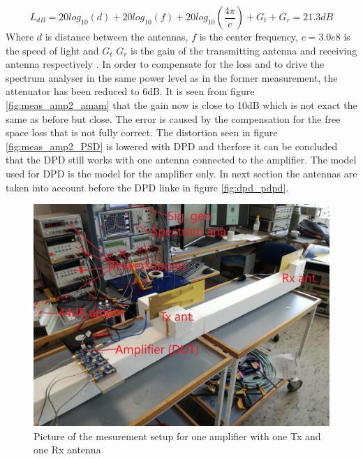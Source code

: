 \begin{equation}
 L_{dB} = 20log_{10}(d)+20log_{10}(f)+20log_{10}(\frac{4\pi}{c})+G_t+G_r = 21.3dB
\end{equation}
Where $d$ is distance between the antennas, $f$ is the center frequency, $c=3.0e8$ is the speed of light and $G_t$ $G_r$ is the gain of the transmitting antenna and receiving antenna respectively \citep{Balanis2005}. In order to compensate for the loss and to drive the spectrum analyser in the same power level as in the former measurement, the attenuator has been reduced to 6dB. It is seen from figure \ref{fig:meas_amp2_amam} that the gain now is close to 10dB which is not exact the same as before but close. The error is caused by the compensation for the free space loss that is not fully correct. The distortion seen in figure \ref{fig:meas_amp2_PSD} is lowered with DPD and therfore it can be concluded that the DPD still works with one antenna connected to the amplifier. The model used for DPD is the model for the amplifier only. In next section the antennas are taken into account before the DPD linke in figure \ref{fig:dpd_pdpd}.      


\begin{figure}[H]
\centering 
\includegraphics[scale = 0.1]{figures/measurement/cree/meas2/meas2.jpg}
\caption{Picture of the mesurement setup for one amplifier with one Tx and one Rx antenna }
\label{fig:meas_amp2_pic}
\end{figure}



